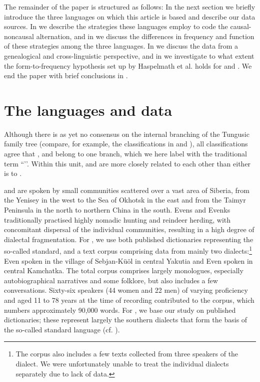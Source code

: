 \documentclass[output=paper,colorlinks,citecolor=brown]{langscibook}
\begin{document}
The remainder of the paper is structured as follows: In the next section we briefly introduce the three languages on which this article is based and describe our data sources. In  we describe the strategies these languages employ to code the causal-noncausal alternation, and in  we discuss the differences in frequency and function of these strategies among the three languages. In  we discuss the  data from a genealogical and cross-linguistic perspective, and in  we investigate to what extent the form-to-frequency hypothesis set up by Haspelmath et al. holds for  and . We end the paper with brief conclusions in .


\section{The languages and data}\label{section2.2}

Although there is as yet no consensus on the internal branching of the Tungusic family tree (compare, for example, the classifications in \citealt{Atknine1997} and \citealt{Janhunen2012a}), all classifications agree that ,  and  belong to one branch, which we here label with the traditional term ``’’. Within this unit,  and  are more closely related to each other than either is to . 

 and  are spoken by small communities scattered over a vast area of Siberia, from the Yenisey in the west to the Sea of Okhotsk in the east and from the Taimyr Peninsula in the north to northern China in the south. Evens and Evenks traditionally practised highly nomadic hunting and reindeer herding, with concomitant dispersal of the individual communities, resulting in a high degree of dialectal fragmentation. For , we use both published dictionaries representing the so-called standard, and a text corpus comprising data from mainly two dialects:\footnote{The corpus also includes a few texts collected from three speakers of the  dialect. We were unfortunately unable to treat the individual dialects separately due to lack of data.}  Even spoken in the village of Sebjan-Küöl in central Yakutia and  Even spoken in central Kamchatka. The total  corpus comprises largely monologues, especially autobiographical narratives and some folklore, but also includes a few conversations. Sixty-six speakers (44 women and 22 men) of varying proficiency and aged 11 to 78 years at the time of recording contributed to the corpus, which numbers approximately 90,000 words. For , we base our study on published dictionaries; these represent largely the southern dialects that form the basis of the so-called standard language (cf. ).\largerpage
\end{document}

